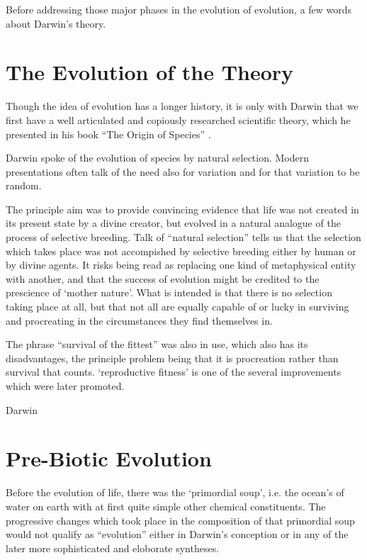 Before addressing those major phases in the evolution of evolution, a few words about Darwin's theory.

\section{The Evolution of the Theory}

Though the idea of evolution has a longer history, it is only with Darwin that we first have a well articulated and copiously researched scientific theory, which he presented in his book ``The Origin of Species'' \cite{darwin-oos}. 

Darwin spoke of the evolution of species by natural selection.
Modern presentations often talk of the need also for variation and for that variation to be random.

The principle aim was to provide convincing evidence that life was not created in its present state by a divine creator, but evolved in a natural analogue of the process of selective breeding.
Talk of ``natural selection'' tells us that the selection which takes place was not accompished by selective breeding either by human or by divine agents.
It risks being read as replacing one kind of metaphysical entity with another, and that the success of evolution might be credited to the prescience of `mother nature'.
What is intended is that there is no selection taking place at all, but that not all are equally capable of or lucky in surviving and procreating in the circumstances they find themselves in.

The phrase ``survival of the fittest'' was also in use, which also has its disadvantages, the principle problem being that it is procreation rather than survival that counts.
`reproductive fitness' is one of the several improvements which were later promoted.

Darwin 

\section{Pre-Biotic Evolution}

Before the evolution of life, there was the `primordial soup', i.e. the ocean's of water on earth with at first quite simple other chemical constituents.
The progressive changes which took place in the composition of that primordial soup would not qualify as ``evolution'' either in Darwin's conception or in any of the later more sophisticated and eloborate syntheses.


